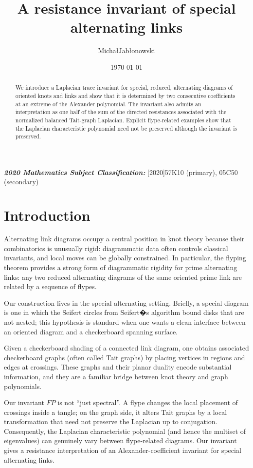 \documentclass[a4paper,12pt]{amsart}
\title{A resistance invariant of special alternating links}
\author{Micha\l \;Jab\l onowski}
\date{\today}
\numberwithin{equation}{section}
\theoremstyle{plain}
\theoremstyle{definition}
\providecommand{\subjclass}[1]{\textbf{\textit{2020 Mathematics Subject Classification:}} #1}
\begin{document}
	


\subjclass[2020]{57K10 (primary), 05C50 (secondary)}

\maketitle


\begin{abstract}
We introduce a Laplacian trace invariant for special, reduced,
alternating diagrams of oriented knots and links and show that it is
determined by two consecutive coefficients at an extreme of the
Alexander polynomial.
The invariant also admits an interpretation as one half of the sum
of the directed resistances associated with the normalized balanced
Tait-graph Laplacian. Explicit flype-related examples show that the
Laplacian characteristic polynomial need not be preserved although the invariant is preserved.
\end{abstract}

\section{Introduction}

Alternating link diagrams occupy a central position in knot theory because their combinatorics is unusually rigid: diagrammatic data often controls classical invariants, and local moves can be globally constrained. In particular, the flyping theorem provides a strong form of
diagrammatic rigidity for prime alternating links: any two reduced alternating diagrams of the same oriented prime link are related by a sequence of flypes.
\par 
Our construction lives in the special alternating setting. Briefly, a special diagram is one in which the Seifert circles from Seifert�s algorithm bound disks that are not nested; this hypothesis is standard when one wants a clean interface between an oriented diagram and a checkerboard spanning surface.
\par 
Given a checkerboard shading of a connected link diagram, one obtains associated checkerboard graphs (often called Tait graphs) by placing vertices in regions and edges at crossings. These graphs and their planar duality encode substantial information, and they are a familiar bridge between knot theory and graph polynomials.
\par 
Our invariant $FP$ is not ``just spectral''. A flype changes the local placement of crossings inside a tangle; on the graph side, it alters Tait graphs by a local transformation that need not preserve the Laplacian up to conjugation. Consequently, the Laplacian characteristic polynomial (and hence the multiset of eigenvalues) can genuinely vary between flype-related diagrams. Our invariant gives a resistance interpretation of an Alexander-coefficient invariant for special alternating links.
\end{document}
